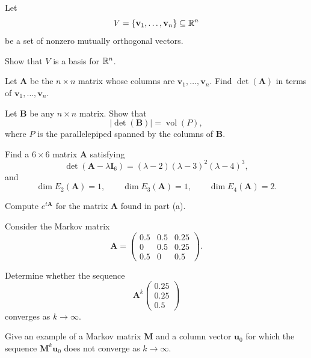\documentclass[11pt,oneside]{article}
\begin{document}
\begin{problem}
Let
\[
V=\{\mathbf v_1,\dots,\mathbf v_n\}\subseteq\mathbb{R}^n
\]
be a set of nonzero mutually orthogonal vectors.
\begin{problemsubparts}
\item Show that $V$ is a basis for $\mathbb{R}^n$.
\item Let $\mathbf A$ be the $n\times n$ matrix whose columns are $\mathbf v_1,\dots,\mathbf v_n$. Find $\det(\mathbf A)$ in terms of $\mathbf v_1,\dots,\mathbf v_n$.
\item Let $\mathbf B$ be any $n\times n$ matrix. Show that
\[
|\det(\mathbf B)|=\operatorname{vol}(P),
\]
where $P$ is the parallelepiped spanned by the columns of $\mathbf B$.
\end{problemsubparts}
\end{problem}

\begin{problem}
\begin{problemsubparts}
\item Find a $6\times6$ matrix $\mathbf A$ satisfying
\[
\det(\mathbf A-\lambda\mathbf I_6)
=(\lambda-2)(\lambda-3)^2(\lambda-4)^3,
\]
and
\[
\dim E_2(\mathbf A)=1,
\qquad
\dim E_3(\mathbf A)=1,
\qquad
\dim E_4(\mathbf A)=2.
\]
\item Compute $e^{t\mathbf A}$ for the matrix $\mathbf A$ found in part \textup{(a)}.
\end{problemsubparts}
\end{problem}

\begin{problem}
Consider the Markov matrix
\[
\mathbf A=
\begin{pmatrix}
0.5&0.5&0.25\\
0&0.5&0.25\\
0.5&0&0.5
\end{pmatrix}.
\]
\begin{problemsubparts}
\item Determine whether the sequence
\[
\mathbf A^k
\begin{pmatrix}
0.25\\0.25\\0.5
\end{pmatrix}
\]
converges as $k\to\infty$.
\item Give an example of a Markov matrix $\mathbf M$ and a column vector $\mathbf u_0$ for which the sequence $\mathbf M^k\mathbf u_0$ does not converge as $k\to\infty$.
\end{problemsubparts}
\end{problem}
\end{document}
